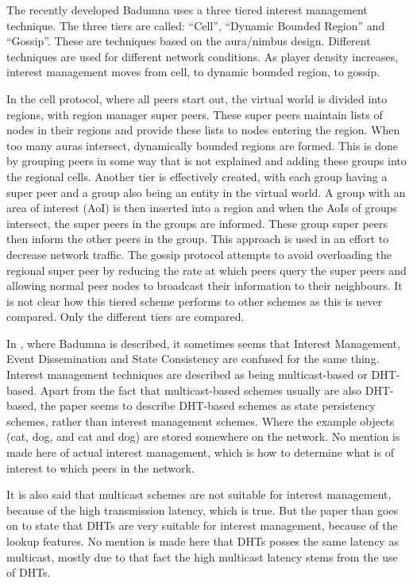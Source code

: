 \documentclass[journal,oneside,a4paper,onecolumn]{IEEEtran}
\begin{document}
The recently developed Badumna uses a three tiered interest management technique. The three tiers are called: ``Cell'', ``Dynamic Bounded Region'' and ``Gossip''. These are techniques based on the aura/nimbus design. Different techniques are used for different network conditions. As player density increases, interest management moves from cell, to dynamic bounded region, to gossip.

In the cell protocol, where all peers start out, the virtual world is divided into regions, with region manager super peers. These super peers maintain lists of nodes in their regions and provide these lists to nodes entering the region. When too many auras intersect, dynamically bounded regions are formed. This is done by grouping peers in some way that is not explained and adding these groups into the regional cells. Another tier is effectively created, with each group having a super peer and a group also being an entity in the virtual world. A group with an area of interest (AoI) is then inserted into a region and when the AoIs of groups intersect, the super peers in the groups are informed. These group super peers then inform the other peers in the group. This approach is used in an effort to decrease network traffic. The gossip protocol attempts to avoid overloading the regional super peer by reducing the rate at which peers query the super peers and allowing normal peer nodes to broadcast their information to their neighbours. It is not clear how this tiered scheme performs to other schemes as this is never compared. Only the different tiers are compared.

In \cite{badumna_engine}, where Badumna is described, it sometimes seems that Interest Management, Event Dissemination and State Consistency are confused for the same thing. Interest management techniques are described as being multicast-based or DHT-based. Apart from the fact that multicast-based schemes usually are also DHT-based, the paper seems to describe DHT-based schemes as state persistency schemes, rather than interest management schemes. Where the example objects (cat, dog, and cat and dog) are stored somewhere on the network. No mention is made here of actual interest management, which is how to determine what is of interest to which peers in the network.

It is also said that multicast schemes are not suitable for interest management, because of the high transmission latency, which is true. But the paper than goes on to state that DHTs are very suitable for interest management, because of the lookup features. No mention is made here that DHTs posses the same latency as multicast, mostly due to that fact the high multicast latency stems from the use of DHTs.
\end{document}
